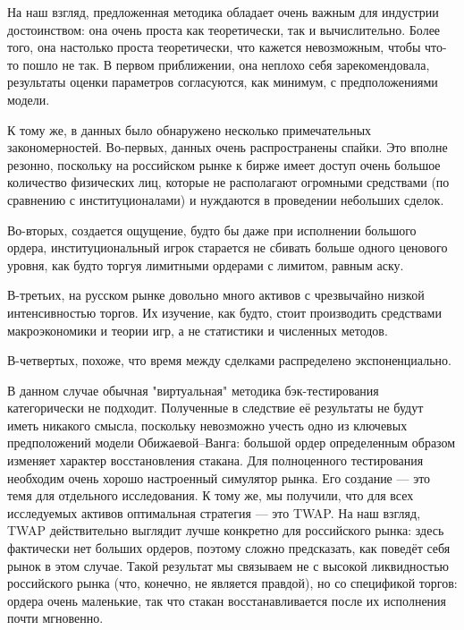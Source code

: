 \conclusion %


На наш взгляд, предложенная методика обладает очень важным для индустрии достоинством: 
она очень проста как теоретически, так и вычислительно. Более того, она настолько проста теоретически,
что кажется невозможным, чтобы что-то пошло не так.
В первом приближении, она неплохо себя зарекомендовала, результаты оценки параметров согласуются,
как минимум, с предположениями модели. 
\par
К тому же, в данных было обнаружено несколько примечательных закономерностей.
Во-первых, данных очень распространены спайки. Это вполне резонно, поскольку на российском рынке к бирже имеет доступ
очень большое количество физических лиц, которые не располагают огромными средствами (по сравнению с институционалами)
и нуждаются в проведении небольших сделок.
\par
Во-вторых, создается ощущение, будто бы даже при исполнении большого ордера, институциональный игрок старается не сбивать
больше одного ценового уровня, как будто торгуя лимитными ордерами с лимитом, равным аску.
\par
В-третьих, на русском рынке довольно много активов с чрезвычайно низкой интенсивностью торгов. Их изучение, как будто,
стоит производить средствами макроэкономики и теории игр, а не статистики и численных методов.
\par
В-четвертых, похоже, что время между сделками распределено экспоненциально.
\par
В данном случае обычная "виртуальная" методика бэк-тестирования категорически не подходит. Полученные в следствие её результаты
не будут иметь никакого смысла, поскольку невозможно учесть одно из ключевых предположений модели Обижаевой--Ванга:
большой ордер определенным образом изменяет характер восстановления стакана. Для полноценного тестирования необходим 
очень хорошо настроенный симулятор рынка. Его создание --- это темя для отдельного исследования. К тому же, мы получили,
что для всех исследуемых активов оптимальная стратегия --- это TWAP. На наш взгляд, TWAP действительно выглядит лучше
конкретно для российского рынка: здесь фактически нет больших ордеров, поэтому сложно предсказать, как поведёт себя рынок 
в этом случае. Такой результат мы связываем не с высокой ликвидностью российского рынка (что, конечно, не является правдой),
но со спецификой торгов: ордера очень маленькие, так что стакан восстанавливается после их исполнения почти мгновенно.